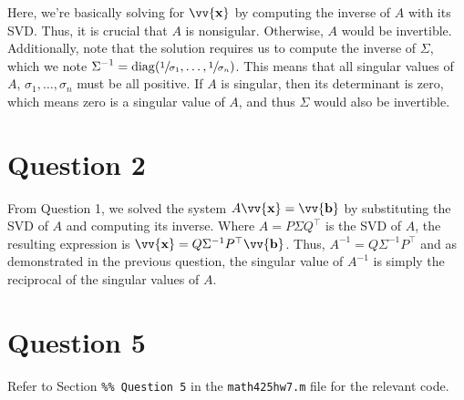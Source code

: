 \documentclass[12pt]{article}
\newcommand{\vect}[1]{\vv{\mathbf{#1}}}
\newcommand{\code}[1]{\texttt{#1}}
\begin{document}
Here, we're basically solving for $\vect{x}$ by computing the inverse of $A$ with its SVD. Thus, it is crucial that $A$ is nonsigular. Otherwise, $A$ would be invertible. Additionally, note that the solution requires us to compute the inverse of $\Sigma$, which we note $\displaystyle \Sigma^{-1} = \operatorname{diag}(\sfrac{1}{\sigma_1},\ldots,\sfrac{1}{\sigma_n})$. This means that all singular values of $A$, $\sigma_1,\ldots,\sigma_n$ must be all positive. If $A$ is singular, then its determinant is zero, which means zero is a singular value of $A$, and thus $\Sigma$ would also be invertible.

\section*{Question 2}

From Question 1, we solved the system $A\vect{x}=\vect{b}$ by substituting the SVD of $A$ and computing its inverse. Where $A=P\Sigma Q^\top$ is the SVD of $A$, the resulting expression is $\vect{x} = Q\Sigma^{-1}P^\top\vect{b}$. Thus, $A^{-1}=Q\Sigma^{-1}P^\top$ and as demonstrated in the previous question, the singular value of $A^{-1}$ is simply the reciprocal of the singular values of $A$.

\section*{Question 5}

Refer to Section \code{\%\% Question 5} in the \code{math425hw7.m} file for the relevant code.
\end{document}
